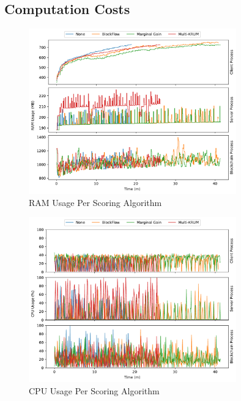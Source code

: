 \vfill

\clearpage

\subsection{Computation Costs}

\begin{figure}[!hpt]
    \centering
    \centering
    \includegraphics[width=0.8\textwidth]{graphics/scoring/ram.pdf}
    \caption{RAM Usage Per Scoring Algorithm}
    \label{fig:ram_scoring}
\end{figure}

\begin{figure}[!hpb]
    \centering
    \centering
    \includegraphics[width=0.8\textwidth]{graphics/scoring/cpu.pdf}
    \caption{CPU Usage Per Scoring Algorithm}
    \label{fig:cpu_scoring}
\end{figure}

\clearpage

